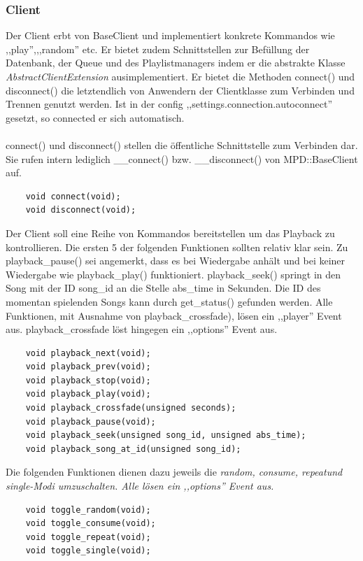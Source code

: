 \subsubsection{Client}
Der Client erbt von BaseClient und implementiert konkrete Kommandos wie ,,play'',,,random'' etc.
Er bietet zudem Schnittstellen zur Befüllung der Datenbank, der Queue und des Playlistmanagers indem 
er die abstrakte Klasse \emph{AbstractClientExtension} ausimplementiert.
Er bietet die Methoden connect() und disconnect() die letztendlich von Anwendern der Clientklasse zum Verbinden und Trennen genutzt werden. 
Ist in der config ,,settings.connection.autoconnect'' gesetzt, so connected er sich automatisch.
\\
\\
connect() und disconnect() stellen die öffentliche Schnittstelle zum Verbinden dar.
Sie rufen intern lediglich \_\_connect() bzw. \_\_disconnect() von MPD::BaseClient auf.
\begin{verbatim}
    void connect(void);
    void disconnect(void);
\end{verbatim}

Der Client soll eine Reihe von Kommandos bereitstellen um das Playback zu kontrollieren.
Die ersten 5 der folgenden Funktionen sollten relativ klar sein. 
Zu playback\_pause() sei angemerkt, dass es bei Wiedergabe anhält und bei keiner Wiedergabe wie playback\_play() funktioniert.
playback\_seek() springt in den Song mit der ID song\_id an die Stelle abs\_time in Sekunden.
Die ID des momentan spielenden Songs kann durch get\_status() gefunden werden.
Alle Funktionen, mit Ausnahme von playback\_crossfade), lösen ein ,,player'' Event aus. 
playback\_crossfade löst hingegen ein ,,options'' Event aus.
\begin{verbatim}
    void playback_next(void);
    void playback_prev(void);
    void playback_stop(void);
    void playback_play(void);
    void playback_crossfade(unsigned seconds);    
    void playback_pause(void);
    void playback_seek(unsigned song_id, unsigned abs_time);
    void playback_song_at_id(unsigned song_id);
\end{verbatim}

Die folgenden Funktionen dienen dazu jeweils die \it random, consume, repeat\rm und \textit{single}-Modi umzuschalten.
Alle lösen ein ,,options'' Event aus.
\begin{verbatim}
    void toggle_random(void);
    void toggle_consume(void);
    void toggle_repeat(void);
    void toggle_single(void);
\end{verbatim}


